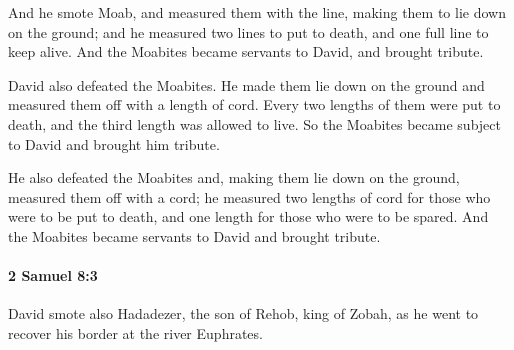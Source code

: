 			\begin{versebox}
					\item[BHS] 
					\item[ASV] And he smote Moab, and measured them with the line, making them to lie down on the ground; and he measured two lines to put to death, and one full line to keep alive. And the Moabites became servants to David, and brought tribute.
					\item[NIV] David also defeated the Moabites. He made them lie down on the ground and measured them off with a length of cord. Every two lengths of them were put to death, and the third length was allowed to live. So the Moabites became subject to David and brought him tribute.
					\item[NRSV] He also defeated the Moabites and, making them lie down on the ground, measured them off with a cord; he measured two lengths of cord for those who were to be put to death, and one length for those who were to be spared. And the Moabites became servants to David and brought tribute.
			\end{versebox}

		\paragraph{2 Samuel 8:3} %
			\label{2SAMUEL-8-3}

			David smote also Hadadezer, the son of Rehob, king of Zobah, as he went to recover his border at the river Euphrates.

